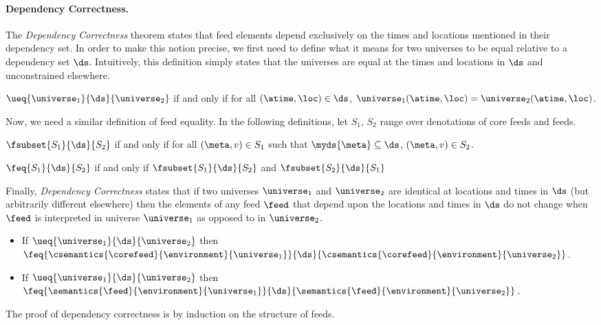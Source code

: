 \paragraph*{Dependency Correctness.}  The {\em Dependency Correctness}
theorem states that feed elements depend exclusively on the times and
locations mentioned in their dependency set.  In order to make this
notion precise, we first need to define what it means for two universes
to be equal relative to a dependency set $\ds$.  Intuitively,
this definition simply states that the universes are equal at the
times and locations in $\ds$ and unconstrained elsewhere.

\begin{definition}
$\ueq{\universe_1}{\ds}{\universe_2}$ if and only if for all
$(\atime,\loc) \in \ds$, $\universe_1(\atime,\loc) = \universe_2(\atime,\loc)$.
\end{definition}

\noindent
Now, we need a similar definition of feed equality.  In the following
definitions, let $S_1$, $S_2$ range over denotations of core feeds and feeds.

\begin{definition}
$\fsubset{S_1}{\ds}{S_2}$ if and only if for all
$(\meta,v) \in S_1$ such that
$\myds{\meta} \subseteq \ds$, $(\meta,v) \in S_2$.
\end{definition}

\begin{definition}
$\feq{S_1}{\ds}{S_2}$ if and only if 
$\fsubset{S_1}{\ds}{S_2}$ and
$\fsubset{S_2}{\ds}{S_1}$
\end{definition}

\noindent
Finally, {\em Dependency Correctness} states that if two universes
$\universe_1$ and $\universe_2$ are identical at locations and times in $\ds$
(but arbitrarily different elsewhere) then the elements of any feed $\feed$
that depend upon the locations and times in $\ds$ do not change when
$\feed$ is interpreted in universe $\universe_1$ 
as opposed to in $\universe_2$.

\begin{theorem}
\begin{itemize}
\item
If $\ueq{\universe_1}{\ds}{\universe_2}$ then
$\feq{\csemantics{\corefeed}{\environment}{\universe_1}}{\ds}{\csemantics{\corefeed}{\environment}{\universe_2}}$.
\item 
If $\ueq{\universe_1}{\ds}{\universe_2}$ then
$\feq{\semantics{\feed}{\environment}{\universe_1}}{\ds}{\semantics{\feed}{\environment}{\universe_2}}$.
\end{itemize}
\end{theorem}

\noindent
The proof of dependency correctness is by induction on the structure of feeds.  




